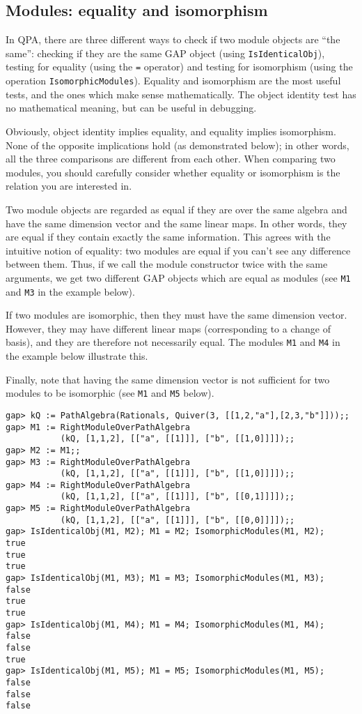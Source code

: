 \documentclass{amsart}
\theoremstyle{definition}
\theoremstyle{theoretic}
\begin{document}
\subsection{Modules: equality and isomorphism}

In QPA, there are three different ways to check if two module objects
are ``the same'': checking if they are the same GAP object (using
\texttt{IsIdenticalObj}), testing for equality (using the \texttt{=}
operator) and testing for isomorphism (using the operation
\texttt{IsomorphicModules}).  Equality and isomorphism are the most
useful tests, and the ones which make sense mathematically.  The
object identity test has no mathematical meaning, but can be useful in
debugging.

Obviously, object identity implies equality, and equality implies
isomorphism.  None of the opposite implications hold (as demonstrated
below); in other words, all the three comparisons are different from
each other.  When comparing two modules, you should carefully consider
whether equality or isomorphism is the relation you are interested in.

Two module objects are regarded as equal if they are over the same
algebra and have the same dimension vector and the same linear maps.
In other words, they are equal if they contain exactly the same
information.  This agrees with the intuitive notion of equality: two
modules are equal if you can't see any difference between them.  Thus,
if we call the module constructor twice with the same arguments, we
get two different GAP objects which are equal as modules (see
\texttt{M1} and \texttt{M3} in the example below).

If two modules are isomorphic, then they must have the same dimension
vector.  However, they may have different linear maps (corresponding
to a change of basis), and they are therefore not necessarily equal.
The modules \texttt{M1} and \texttt{M4} in the example below
illustrate this.

Finally, note that having the same dimension vector is not sufficient
for two modules to be isomorphic (see \texttt{M1} and \texttt{M5}
below).

\begin{verbatim}
gap> kQ := PathAlgebra(Rationals, Quiver(3, [[1,2,"a"],[2,3,"b"]]));;
gap> M1 := RightModuleOverPathAlgebra
           (kQ, [1,1,2], [["a", [[1]]], ["b", [[1,0]]]]);;
gap> M2 := M1;;
gap> M3 := RightModuleOverPathAlgebra
           (kQ, [1,1,2], [["a", [[1]]], ["b", [[1,0]]]]);;
gap> M4 := RightModuleOverPathAlgebra
           (kQ, [1,1,2], [["a", [[1]]], ["b", [[0,1]]]]);;
gap> M5 := RightModuleOverPathAlgebra
           (kQ, [1,1,2], [["a", [[1]]], ["b", [[0,0]]]]);;
gap> IsIdenticalObj(M1, M2); M1 = M2; IsomorphicModules(M1, M2);
true
true
true
gap> IsIdenticalObj(M1, M3); M1 = M3; IsomorphicModules(M1, M3);
false
true
true
gap> IsIdenticalObj(M1, M4); M1 = M4; IsomorphicModules(M1, M4);
false
false
true
gap> IsIdenticalObj(M1, M5); M1 = M5; IsomorphicModules(M1, M5);
false
false
false
\end{verbatim}
\end{document}
